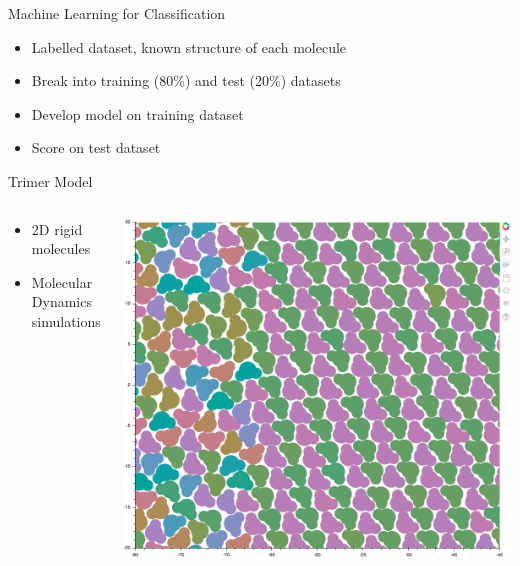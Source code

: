 \documentclass[aspectratio=169, 14pt]{beamer}
\begin{document}
\begin{frame}{Machine Learning for Classification}

  \begin{itemize}
    \item Labelled dataset, known structure of each molecule
    \item Break into training (80\%) and test (20\%) datasets
    \item Develop model on training dataset
    \item Score on test dataset
  \end{itemize}

\end{frame}

\begin{frame}{Trimer Model}

  \begin{columns}
    \begin{column}{0.4\textwidth}
      \begin{itemize}
        \item 2D rigid molecules
        \item Molecular Dynamics simulations
      \end{itemize}
    \end{column}
    \begin{column}{0.6\textwidth}
      \includegraphics[width=\textwidth]{Trimer_snapshot.png}
    \end{column}
  \end{columns}
\end{frame}
\end{document}
